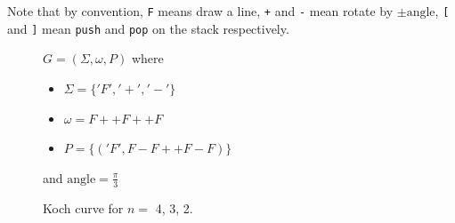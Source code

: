 \documentclass[a4paper]{article}
\begin{document}
Note that by convention, \texttt{F} means draw a line,
\texttt{+} and \texttt{-} mean rotate by \(\pm \text{angle}\),
\texttt{[} and \texttt{]} mean \texttt{push} and \texttt{pop}
on the stack respectively.


\begin{figure}[h]
\begin{minipage}{0.5\textwidth}
    \caption{Koch curve for \(n=\) {\color{blue!50!black}4}, {\color{green!50!black}3}, {\color{red!50!black}2}.}
\end{minipage}
\begin{minipage}{0.5\textwidth}
    \(G=(\Sigma, \omega, P)\)
    where
    \begin{itemize}
        \item \(\Sigma = \{'F', '+', '-'\}\)
        \item \(\omega = F++F++F\)
        \item \(P = \{('F', F-F++F-F)\}\)
    \end{itemize}
    and \(\text{angle}=\frac{\pi}{3}\)
\end{minipage}
\end{figure}
\end{document}
